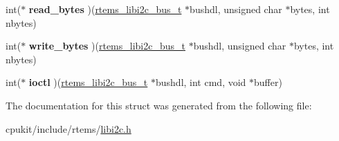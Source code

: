 \begin{DoxyCompactItemize}
int($\ast$ {\bfseries read\+\_\+bytes} )(\mbox{\hyperlink{structrtems__libi2c__bus__t__}{rtems\+\_\+libi2c\+\_\+bus\+\_\+t}} $\ast$bushdl, unsigned char $\ast$bytes, int nbytes)
\item 
\mbox{\label{structrtems__libi2c__bus__ops___afc3fccea7a0e32ada0942498e7eba562}} 
int($\ast$ {\bfseries write\+\_\+bytes} )(\mbox{\hyperlink{structrtems__libi2c__bus__t__}{rtems\+\_\+libi2c\+\_\+bus\+\_\+t}} $\ast$bushdl, unsigned char $\ast$bytes, int nbytes)
\item 
\mbox{\label{structrtems__libi2c__bus__ops___a298ac3fb1d31e94882ed3e4b7b3c4910}} 
int($\ast$ {\bfseries ioctl} )(\mbox{\hyperlink{structrtems__libi2c__bus__t__}{rtems\+\_\+libi2c\+\_\+bus\+\_\+t}} $\ast$bushdl, int cmd, void $\ast$buffer)
\end{DoxyCompactItemize}


The documentation for this struct was generated from the following file\+:\begin{DoxyCompactItemize}
\item 
cpukit/include/rtems/\mbox{\hyperlink{libi2c_8h}{libi2c.\+h}}\end{DoxyCompactItemize}
